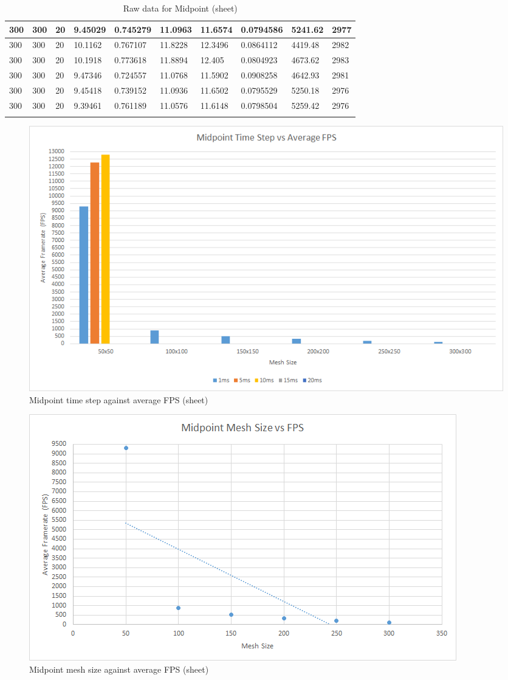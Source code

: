 \begin{landscape}
\begin{longtable}{ | l | l | l | l | l | l | l | l | l | l | }
300 & 300 & 20 & 9.45029 & 0.745279 & 11.0963 & 11.6574 & 0.0794586 & 5241.62 & 2977\\ \hline
300 & 300 & 20 & 10.1162 & 0.767107 & 11.8228 & 12.3496 & 0.0864112 & 4419.48 & 2982\\ \hline
300 & 300 & 20 & 10.1918 & 0.773618 & 11.8894 & 12.405 & 0.0804923 & 4673.62 & 2983\\ \hline
300 & 300 & 20 & 9.47346 & 0.724557 & 11.0768 & 11.5902 & 0.0908258 & 4642.93 & 2981\\ \hline
300 & 300 & 20 & 9.45418 & 0.739152 & 11.0936 & 11.6502 & 0.0795529 & 5250.18 & 2976\\ \hline
300 & 300 & 20 & 9.39461 & 0.761189 & 11.0576 & 11.6148 & 0.0798504 & 5259.42 & 2976\\ \hline
    \caption{Raw data for Midpoint (sheet)}
    \label{tab:m raw sheet}
\end{longtable}

  \begin{figure}[!htb]
    \begin{center}
      \includegraphics{Figures/sheet_m_fps}
    \end{center}
    \caption{Midpoint time step against average FPS (sheet)}
    \label{fig:m fps sheet}
  \end{figure}
\end{landscape}
  
    \begin{figure}
    \begin{center}
      \includegraphics[scale=.9]{Figures/sheet_m_m_fps}
    \end{center}
    \caption{Midpoint mesh size against average FPS (sheet)}
    \label{fig:m mesh fps sheet}
  \end{figure}
  

